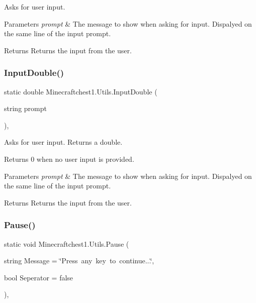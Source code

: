 Asks for user input. 


\begin{DoxyParams}{Parameters}
{\em prompt} & The message to show when asking for input. Dispalyed on the same line of the input prompt. \\
\hline
\end{DoxyParams}
\begin{DoxyReturn}{Returns}
Returns the input from the user. 
\end{DoxyReturn}
\mbox{\label{class_minecraftchest1_1_1_utils_a0f88327089e8a17005bc3c7981487c32}} 
\subsubsection{\texorpdfstring{Input\+Double()}{InputDouble()}}
{\footnotesize\ttfamily static double Minecraftchest1.\+Utils.\+Input\+Double (\begin{DoxyParamCaption}\item[{string}]{prompt }\end{DoxyParamCaption})\hspace{0.3cm}{\ttfamily [inline]}, {\ttfamily [static]}}

Asks for user input. Returns a double. 

Returns 0 when no user input is provided. 


\begin{DoxyParams}{Parameters}
{\em prompt} & The message to show when asking for input. Dispalyed on the same line of the input prompt. \\
\hline
\end{DoxyParams}
\begin{DoxyReturn}{Returns}
Returns the input from the user. 
\end{DoxyReturn}
\mbox{\label{class_minecraftchest1_1_1_utils_a93d87d31f16115eb3ef2da07ef774530}} 
\subsubsection{\texorpdfstring{Pause()}{Pause()}}
{\footnotesize\ttfamily static void Minecraftchest1.\+Utils.\+Pause (\begin{DoxyParamCaption}\item[{string}]{Message = {\ttfamily \char`\"{}Press~any~key~to~continue...\char`\"{}},  }\item[{bool}]{Seperator = {\ttfamily false} }\end{DoxyParamCaption})\hspace{0.3cm}{\ttfamily [inline]}, {\ttfamily [static]}}

